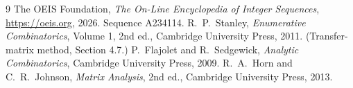 \documentclass[11pt,a4paper]{article}
\theoremstyle{plain}
\theoremstyle{definition}
\begin{document}
\begin{thebibliography}{9}
 The OEIS Foundation, \emph{The On-Line Encyclopedia of Integer
Sequences}, \url{https://oeis.org}, 2026. Sequence A234114.
 R.~P.~Stanley, \emph{Enumerative Combinatorics}, Volume 1, 2nd ed.,
Cambridge University Press, 2011. (Transfer-matrix method, Section 4.7.)
 P.~Flajolet and R.~Sedgewick, \emph{Analytic Combinatorics}, Cambridge
University Press, 2009.
 R.~A.~Horn and C.~R.~Johnson, \emph{Matrix Analysis}, 2nd ed., Cambridge
University Press, 2013.
\end{thebibliography}
\end{document}
